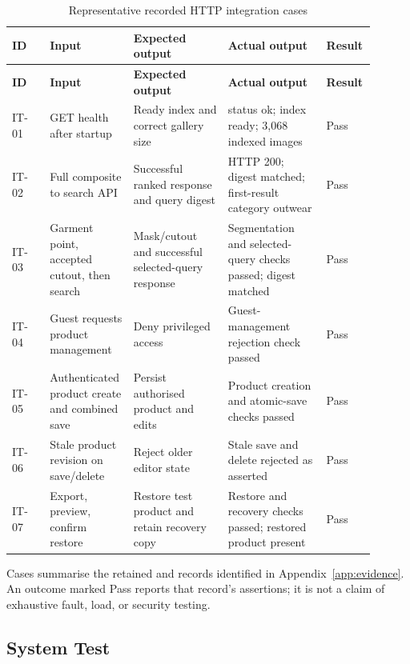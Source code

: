 \begin{ReportTable}\setlength{\tabcolsep}{3pt}
\begin{longtable}{@{}L{0.10\linewidth}L{0.21\linewidth}L{0.25\linewidth}L{0.26\linewidth}L{0.08\linewidth}@{}}
\caption{Representative recorded HTTP integration cases}\label{tab:integration-cases}\\
\toprule\textbf{ID}&\textbf{Input}&\textbf{Expected output}&\textbf{Actual output}&\textbf{Result}\\\midrule\endfirsthead
\toprule\textbf{ID}&\textbf{Input}&\textbf{Expected output}&\textbf{Actual output}&\textbf{Result}\\\midrule\endhead
IT-01 & GET health after startup & Ready index and correct gallery size & status ok; index ready; 3,068 indexed images & Pass\\\addlinespace
IT-02 & Full composite to search API & Successful ranked response and query digest & HTTP 200; digest matched; first-result category outwear & Pass\\\addlinespace
IT-03 & Garment point, accepted cutout, then search & Mask/cutout and successful selected-query response & Segmentation and selected-query checks passed; digest matched & Pass\\\addlinespace
IT-04 & Guest requests product management & Deny privileged access & Guest-management rejection check passed & Pass\\\addlinespace
IT-05 & Authenticated product create and combined save & Persist authorised product and edits & Product creation and atomic-save checks passed & Pass\\\addlinespace
IT-06 & Stale product revision on save/delete & Reject older editor state & Stale save and delete rejected as asserted & Pass\\\addlinespace
IT-07 & Export, preview, confirm restore & Restore test product and retain recovery copy & Restore and recovery checks passed; restored product present & Pass\\
\bottomrule
\end{longtable}
\end{ReportTable}

Cases summarise the retained  and
 records identified in Appendix~\ref{app:evidence}.
An outcome marked Pass reports that record's assertions; it is not a claim of
exhaustive fault, load, or security testing.

\subsection{System Test}
